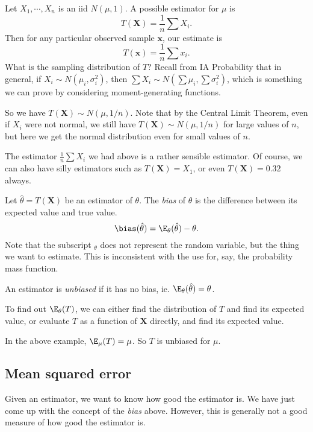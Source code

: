 \documentclass[a4paper]{article}
\begin{document}
\begin{eg}
  Let $X_1, \cdots, X_n$ is an iid $N(\mu, 1)$. A possible estimator for $\mu$ is
  \[
    T(\mathbf{X}) = \frac{1}{n}\sum X_i.
  \]
  Then for any particular observed sample $\mathbf{x}$, our estimate is
  \[
    T(\mathbf{x}) = \frac{1}{n}\sum x_i.
  \]
  What is the sampling distribution of $T$? Recall from IA Probability that in general, if $X_i \sim N(\mu_i, \sigma_i^2)$, then $\sum X_i \sim N(\sum \mu_i, \sum \sigma_i^2)$, which is something we can prove by considering moment-generating functions.

  So we have $T(\mathbf{X})\sim N(\mu, 1/n)$. Note that by the Central Limit Theorem, even if $X_i$ were not normal, we still have $T(\mathbf{X})\sim N(\mu, 1/n)$ for large values of $n$, but here we get the normal distribution even for small values of $n$.
\end{eg}
The estimator $\frac{1}{n}\sum X_i$ we had above is a rather sensible estimator. Of course, we can also have silly estimators such as $T(\mathbf{X}) = X_1$, or even $T(\mathbf{X}) = 0.32$ always.

\begin{defi}[Bias]
  Let $\hat{\theta} = T(\mathbf{X})$ be an estimator of $\theta$. The \emph{bias} of $\hat{\theta}$ is the difference between its expected value and true value.
  \[
    \bias(\hat{\theta}) = \E_\theta(\hat{\theta}) - \theta.
  \]
  Note that the subscript $_\theta$ does not represent the random variable, but the thing we want to estimate. This is inconsistent with the use for, say, the probability mass function.

  An estimator is \emph{unbiased} if it has no bias, ie. $\E_\theta(\hat{\theta}) = \theta$.
\end{defi}
To find out $\E_\theta (T)$, we can either find the distribution of $T$ and find its expected value, or evaluate $T$ as a function of $\mathbf{X}$ directly, and find its expected value.

\begin{eg}
  In the above example, $\E_\mu(T) =\mu$. So $T$ is unbiased for $\mu$.
\end{eg}

\subsection{Mean squared error}
Given an estimator, we want to know how good the estimator is. We have just come up with the concept of the \emph{bias} above. However, this is generally not a good measure of how good the estimator is.
\end{document}
